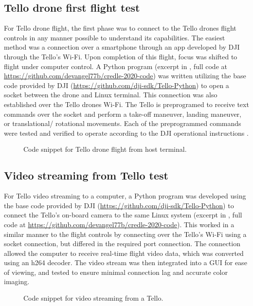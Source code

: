 \documentclass[onecolumn,10pt]{IEEEtran}
\begin{document}
\subsection{Tello drone first flight test}
For Tello drone flight, the first phase was to connect to the Tello drones flight controls in any manner possible to understand its capabilities. The easiest method was a connection over a smartphone through an app developed by DJI through the Tello’s Wi-Fi. Upon completion of this flight, focus was shifted to flight under computer control. A Python program (excerpt in , full code at \url{https://github.com/devangel77b/credle-2020-code}) was written utilizing the base code provided by DJI (\url{https://github.com/dji-sdk/Tello-Python}) to open a socket between the drone and Linux terminal. This connection was also established over the Tello drones Wi-Fi. The Tello is preprogramed to receive text commands over the socket and perform a take-off maneuver, landing maneuver, or translational/ rotational movements. Each of the preprogrammed commands were tested and verified to operate according to the DJI operational instructions \cite{tello-manual}.
\begin{figure}
\caption{Code snippet for Tello drone flight from host terminal.}
\label{fig:pseudocode1}

\end{figure}

\subsection{Video streaming from Tello test}
For Tello video streaming to a computer, a Python program was developed using the base code provided by DJI (\url{https://github.com/dji-sdk/Tello-Python}) to connect the Tello’s on-board camera to the same Linux system (excerpt in , full code at \url{https://github.com/devangel77b/credle-2020-code}). This worked in a similar manner to the flight controls by connecting over the Tello’s Wi-Fi using a socket connection, but differed in the required port connection. The connection allowed the computer to receive real-time flight video data, which was converted using an h264 decoder. The video stream was then integrated into a GUI for ease of viewing, and tested to ensure minimal connection lag and accurate color imaging.
\begin{figure}
\caption{Code snippet for video streaming from a Tello.}
\label{fig:pseudocode2}

\end{figure}
\end{document}
